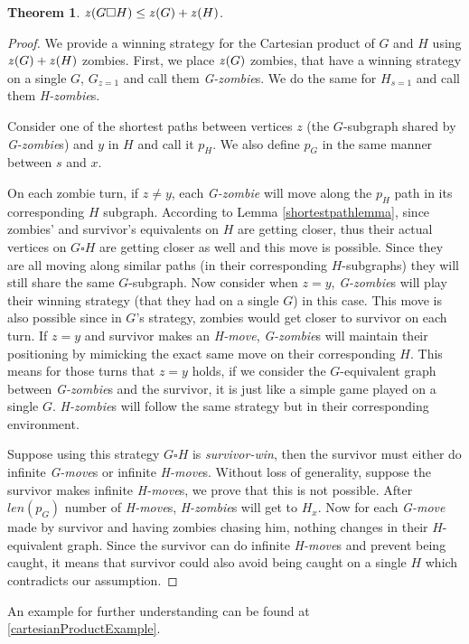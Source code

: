 \documentclass[1p]{elsarticle}
\newtheorem{theorem}{Theorem}
\newcommand{\zn}{\ooalign{$z$\cr\hfil\rule[.5ex]{.2em}{.08ex}\hfil\cr}}
\begin{document}
\begin{theorem}
	\label{T2}
	$\zn(G \square H) \leq \zn(G) + \zn(H)$.
\end{theorem}

\begin{proof}
	We provide a winning strategy for the Cartesian product of $G$ and $H$ using $\zn(G)+\zn(H)$ zombies. First, we place
	$\zn(G)$ zombies, that have a winning strategy on a single $G$, $G_{z = 1}$ and call them {\it G-zombie}s. We do the
	same for $H_{s = 1}$ and call them {\it H-zombie}s.


	Consider one of the shortest paths between vertices $z$ (the $G$-subgraph shared by {\it G-zombie}s) and $y$ in $H$
	and call it $p_H$. We also define $p_G$ in the same manner between $s$ and $x$.


	On each zombie turn, if $z \neq y$, each {\it G-zombie} will move along the $p_H$ path in its corresponding $H$
	subgraph. According to Lemma \ref{shortestpathlemma}, since zombies' and survivor's equivalents on $H$ are getting
	closer, thus their actual vertices on $G \square H$ are getting closer as well and this move is possible. Since they
	are all moving along similar paths (in their corresponding $H$-subgraphs) they will still share the same
	$G$-subgraph. Now consider when $z = y$, {\it G-zombie}s will play their winning strategy (that they had on a single
	$G$) in this case. This move is also possible since in $G$'s strategy, zombies would get closer to survivor on each
	turn. If $z = y$ and survivor makes an {\it H-move}, {\it G-zombie}s will maintain their positioning by mimicking
	the exact same move on their corresponding $H$. This means for those turns that $z=y$ holds, if we consider the
	$G$-equivalent graph between {\it G-zombie}s and the survivor, it is just like a simple game played on a single $G$.
	{\it H-zombie}s will follow the same strategy but in their corresponding environment.
	
	
	Suppose using this strategy $G \square H$ is {\it survivor-win}, then the survivor must either do infinite {\it
	G-move}s or infinite {\it H-move}s. Without loss of generality, suppose the survivor makes infinite {\it H-move}s,
	we prove that this is not possible. After $len(p_G)$ number of {\it H-move}s, {\it H-zombie}s will get to $H_x$. Now for
	each {\it G-move} made by survivor and having zombies chasing him, nothing changes in their $H$-equivalent graph.
	Since the survivor can do infinite {\it H-move}s and prevent being caught, it means that survivor could also avoid
	being caught on a single $H$ which contradicts our assumption.
	
\end{proof}
An example for further understanding can be found at \ref{cartesianProductExample}.
\end{document}

